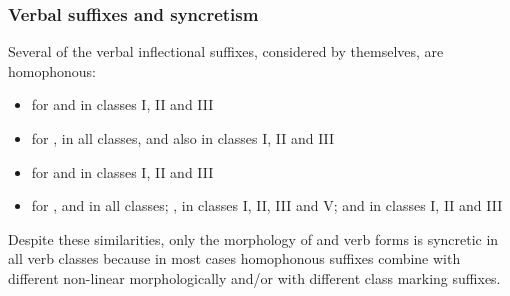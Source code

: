 \subsubsection{Verbal suffixes and syncretism}\label{verbalSuffixesSyncretism}
Several of the verbal inflectional suffixes, considered by themselves, are homophonous: %
\begin{itemize}
\item{ for  and  in classes I, II and III}
\item{ for ,  in all classes, and also  in classes I, II and III}
\item{ for  and  in classes I, II and III}
\item{ for ,  and  in all classes; ,  in classes I, II, III and V; and  in classes I, II and III}
\end{itemize}

Despite these similarities, only the morphology of  and  verb forms is syncretic in all verb classes because in most cases homophonous suffixes combine with different non-linear morphologically and/or with different class marking suffixes. 



